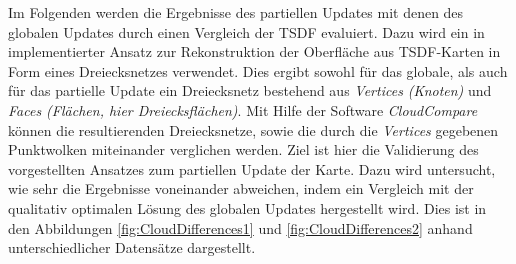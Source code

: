 Im Folgenden werden die Ergebnisse des partiellen Updates mit denen des globalen Updates durch einen Vergleich der TSDF evaluiert. Dazu wird ein in \cite{HATSDF} implementierter Ansatz zur Rekonstruktion der Oberfläche aus TSDF-Karten in Form eines Dreiecksnetzes verwendet. Dies ergibt sowohl für das globale, als auch für das partielle Update ein Dreiecksnetz bestehend aus \emph{Vertices (Knoten)} und \emph{Faces (Flächen, hier Dreiecksflächen)}. Mit Hilfe der Software \emph{CloudCompare} \cite{cloudcompare} können die resultierenden Dreiecksnetze, sowie die durch die \emph{Vertices} gegebenen Punktwolken miteinander verglichen werden. Ziel ist hier die Validierung des vorgestellten Ansatzes zum partiellen Update der Karte. Dazu wird untersucht, wie sehr die Ergebnisse voneinander abweichen, indem ein Vergleich mit der qualitativ optimalen Lösung des globalen Updates hergestellt wird. Dies ist in den Abbildungen \ref{fig:CloudDifferences1} und \ref{fig:CloudDifferences2} anhand unterschiedlicher Datensätze dargestellt.

